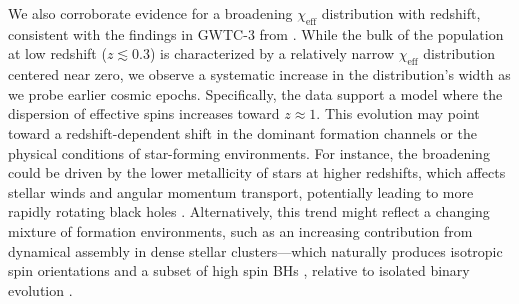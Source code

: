 \begin{refsection}
We also corroborate evidence for a broadening $\chi_{\text{eff}}$ distribution with redshift, consistent with the findings in GWTC-3 from \citet{Biscoveanu:2022qac, Heinzel:2023hlb}. While the bulk of the population at low redshift ($z \lesssim 0.3$) is characterized by a relatively narrow $\chi_{\text{eff}}$ distribution centered near zero, we observe a systematic increase in the distribution's width as we probe earlier cosmic epochs. Specifically, the data support a model where the dispersion of effective spins increases toward $z \approx 1$. This evolution may point toward a redshift-dependent shift in the dominant formation channels or the physical conditions of star-forming environments. For instance, the broadening could be driven by the lower metallicity of stars at higher redshifts, which affects stellar winds and angular momentum transport, potentially leading to more rapidly rotating black holes \citep{Bavera:2022mef}. Alternatively, this trend might reflect a changing mixture of formation environments, such as an increasing contribution from dynamical assembly in dense stellar clusters—which naturally produces isotropic spin orientations and a subset of high spin \acp{BH} \citep[e.g.,][]{Gerosa:2021mno}, relative to isolated binary evolution \citep[e.g.,][]{Belczynski:2017gds}.


\printbibliography[heading=subbibliography]
\end{refsection}
